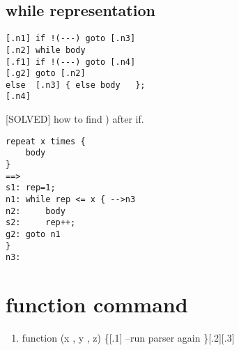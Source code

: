 \documentclass{article}
\begin{document}
\subsection{while representation}
\begin{lstlisting}
[.n1] if !(---) goto [.n3]
[.n2] while body
[.f1] if !(---) goto [.n4]
[.g2] goto [.n2]
else  [.n3] { else body   };
[.n4]
\end{lstlisting}

[SOLVED] how to find ) after if.


\begin{lstlisting}
repeat x times {
	body
}
==>
s1: rep=1;
n1: while rep <= x { -->n3
n2:     body
s2:     rep++;
g2: goto n1
}
n3:
\end{lstlisting}



\section{function command}
\begin{enumerate}
\item
function (x , y  , z) \{[.1]
	--run parser again
\}[.2][.3]
\end{enumerate}
\end{document}

